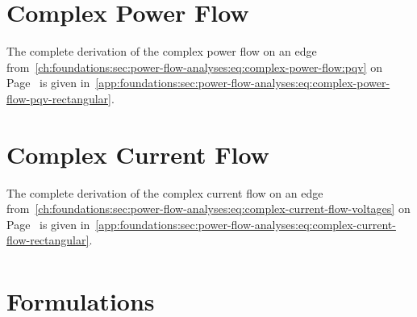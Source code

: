 \section{Complex Power Flow}
\label{app:fundamentals:sec:complex-power-flow}
% 
The complete derivation of the complex power flow on an edge
from~\cref{ch:foundations:sec:power-flow-analyses:eq:complex-power-flow:pqv} on
Page~\pageref{ch:foundations:sec:power-flow-analyses:eq:complex-power-flow:pqv}
is given
in~\cref{app:foundations:sec:power-flow-analyses:eq:complex-power-flow-pqv-rectangular}.
% 
\begin{subequations}
    
    \label{app:foundations:sec:power-flow-analyses:eq:complex-power-flow-pqv-rectangular}
\end{subequations}
% 
\clearpage
% 
\section{Complex Current Flow}
\label{app:fundamentals:sec:complex-current-flow}
% 
The complete derivation of the complex current flow on an edge
from~\cref{ch:foundations:sec:power-flow-analyses:eq:complex-current-flow-voltages}
on
Page~\pageref{ch:foundations:sec:power-flow-analyses:eq:complex-current-flow-voltages}
is given
in~\cref{app:foundations:sec:power-flow-analyses:eq:complex-current-flow-rectangular}.
% 
\begin{align}
    
    \label{app:foundations:sec:power-flow-analyses:eq:complex-current-flow-rectangular}
\end{align}
% 
% 
% 
% 
% 
% 
% 
% 
\clearpage
\section{Formulations}
\label{app:fundamentals:sec:formulations}
%

